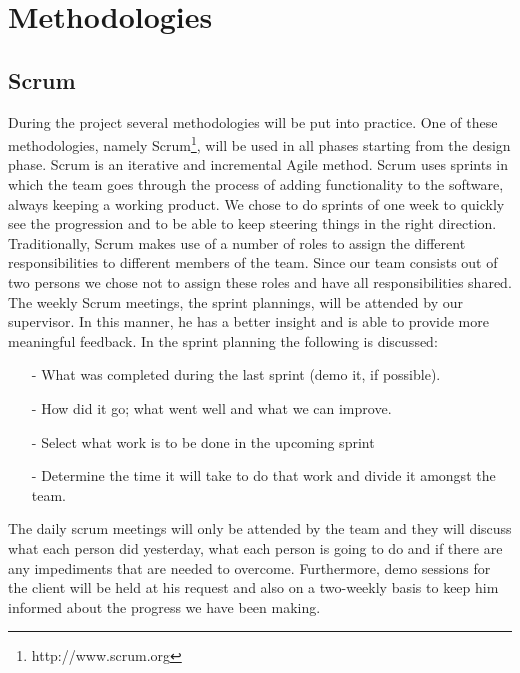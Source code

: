\section{Methodologies}
\subsection{Scrum}
During the project several methodologies will be put into practice. One of these methodologies, namely Scrum\footnote{http://www.scrum.org}, will be used in all phases starting from the design phase. Scrum is an iterative and incremental Agile method. Scrum uses sprints in which the team goes through the process of adding functionality to the software, always keeping a working product. We chose to do sprints of one week to quickly see the progression and to be able to keep steering things in the right direction. Traditionally, Scrum makes use of a number of roles to assign the different responsibilities to different members of the team. Since our team consists out of two persons we chose not to assign these roles and have all responsibilities shared. The weekly Scrum meetings, the sprint plannings, will be attended by our supervisor. In this manner, he has a better insight and  is able to provide more meaningful feedback. In the sprint planning the following is discussed:
\begin{itemize}
\item[-]What was completed during the last sprint (demo it, if possible).
\item[-]How did it go; what went well and what we can improve. 
\item[-]Select what work is to be done in the upcoming sprint
\item[-]Determine the time it will take to do that work and divide it amongst the team.
\end{itemize}
The daily scrum meetings will only be attended by the team and they will discuss what each person did yesterday, what each person is going to do and if there are any impediments that are needed to overcome. Furthermore, demo sessions for the client will be held at his request and also on a two-weekly basis to keep him informed about the progress we have been making.
